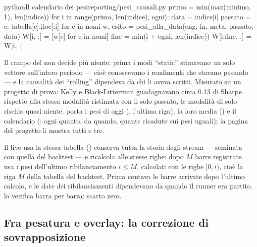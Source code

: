 \begin{codiceInterno}{python}{Il calendario dei pesi}{reporting/pesi\_causali.py}
    primo = min(max(minimo, 1), len(indice))
    for i in range(primo, len(indice), ogni):
        data = indice[i]
        passato = {c: tabella[c].iloc[:i] for c in nomi}
        w, esito = pesi_alla_data(eng, fn, meta, passato, data)
        W[i, :] = [w[c] for c in nomi]
        fine = min(i + ogni, len(indice))
        W[i:fine, :] = W[i, :]
\end{codiceInterno}

\noindent
Il campo  del  non decide più niente: prima i modi
\enquote{static} stimavano un solo vettore sull'intero periodo --- cioè
conoscevano i rendimenti che stavano pesando --- e la causalità dei
\enquote{rolling} dipendeva da chi li aveva scritti. Misurato su un progetto
di prova: Kelly e Black-Litterman guadagnavano circa \num{0.13} di Sharpe
rispetto alla stessa modalità ristimata con il solo passato, le modalità di
solo rischio quasi niente.  porta i pesi di oggi
(, l'ultima riga), la loro media () e il
calendario (: ogni quanto, da quando, quante ricadute sui
pesi uguali); la pagina del progetto li mostra tutti e tre.

\begin{nota}{Il live usa la stessa tabella}
 () conserva
tutta la storia degli stream --- seminata con quella del backtest --- e
ricalcola alle stesse righe: dopo $M$ barre registrate usa i pesi
dell'ultimo ribilanciamento $i \le M$, calcolati con le righe $[0, i)$,
cioè la riga $M$ della tabella del backtest. Prima contava le barre arrivate
dopo l'ultimo calcolo, e le date dei ribilanciamenti dipendevano da quando
il runner era partito.  lo
verifica barra per barra: scarto zero.
\end{nota}

\subsection{Fra pesatura e overlay: la correzione di sovrapposizione}\label{sez:sovrapposizione}

